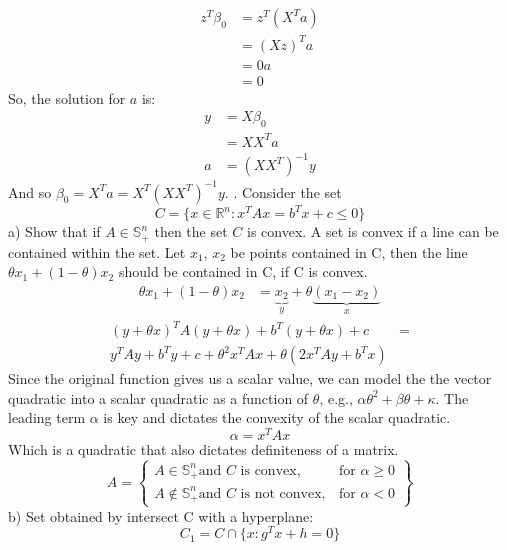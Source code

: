 \documentclass{article}
\begin{document}
\begin{align*}
	z^T\beta_0 &= z^T(X^Ta) \\
	&= (Xz)^Ta \\
	&= 0a \\
	&= 0
\end{align*}
So, the solution for $a$ is:
\begin{align*}
	y &= X\beta_0 \\
	&= XX^Ta \\
	a &= (XX^T)^{-1}y
\end{align*}
And so $\beta_0 = X^Ta = X^T(XX^T)^{-1}y$.
\newpage
{}. Consider the set
\begin{equation}
	C = \{ x \in \mathbb{R}^n : x^TAx = b^Tx + c \leq 0 \}
\end{equation}
a) Show that if $A \in \mathbb{S}^n_+$ then the set $C$ is convex.
A set is convex if a line can be contained within the set. 
Let $x_1$, $x_2$ be points contained in C, then the line $\theta x_1 + (1-\theta) x_2$ should be contained in C, if C is convex.
\begin{align*}
	\theta x_1 + (1-\theta) x_2 &= \underbrace{x_2}_y + \theta\underbrace{(x_1 - x_2)}_x
\end{align*}
\begin{align*}
	(y + \theta x)^TA(y + \theta x) + b^T(y+ \theta x) + c &= \\ y^TAy + b^Ty + c + \theta^2x^TAx + \theta(2x^TAy + b^Tx)
\end{align*}
Since the original function gives us a scalar value, we can model the the vector quadratic into a scalar quadratic as a function of $\theta$, e.g., $\alpha\theta^2 + \beta\theta + \kappa$. The leading term $\alpha$ is key and dictates the convexity of the scalar quadratic. 
\begin{equation*}
	\alpha = x^TAx
\end{equation*}
Which is a quadratic that also dictates definiteness of a matrix.
\begin{equation*}
	A = \left.
	\begin{cases}
		A \in \mathbb{S}^n_+ \text{and } C \text{ is convex} , & \text{for } \alpha \geq 0 \\
		A \not\in \mathbb{S}^n_+ \text{and } C \text{ is not convex}, & \text{for } \alpha < 0
	\end{cases}
	\right\}
\end{equation*}
b) Set obtained by intersect C with a hyperplane:
\begin{equation*}
	C_1 = C \cap \{ x: g^Tx + h = 0 \}
\end{equation*}
\end{document}
